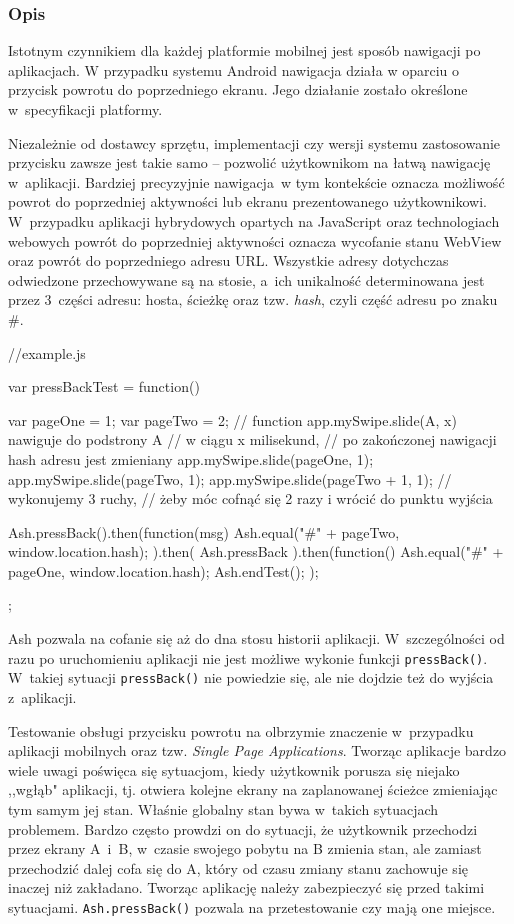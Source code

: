 \documentclass[brudnopis]{xmgr}
\begin{document}
\subsubsection{Opis}

Istotnym czynnikiem dla każdej platformie mobilnej jest sposób nawigacji po aplikacjach.  W przypadku systemu Android nawigacja działa w oparciu o przycisk powrotu do poprzedniego ekranu. Jego działanie zostało określone w~specyfikacji platformy.

Niezależnie od dostawcy sprzętu, implementacji czy wersji systemu zastosowanie przycisku zawsze jest takie samo -- pozwolić użytkownikom na łatwą nawigację w~aplikacji. Bardziej precyzyjnie nawigacja~w tym kontekście  oznacza możliwość powrot do poprzedniej aktywności lub ekranu prezentowanego użytkownikowi. W~przypadku aplikacji hybrydowych opartych na JavaScript oraz technologiach webowych powrót do poprzedniej aktywności oznacza wycofanie stanu WebView oraz powrót do poprzedniego adresu URL. Wszystkie adresy dotychczas odwiedzone przechowywane są na stosie, a~ich unikalność determinowana jest przez 3~części adresu: hosta, ścieżkę oraz tzw. \textit{hash}, czyli część adresu po znaku \#. 

\begin{javascriptcode}
   //example.js

  var pressBackTest = function(){
    var pageOne = 1;
    var pageTwo = 2;
    // function app.mySwipe.slide(A, x) nawiguje do podstrony A 
    // w ciągu x milisekund,
    // po zakończonej nawigacji hash adresu jest zmieniany
    app.mySwipe.slide(pageOne, 1); 
    app.mySwipe.slide(pageTwo, 1); 
    app.mySwipe.slide(pageTwo + 1, 1); //  wykonujemy 3 ruchy, 
       //  żeby móc cofnąć się 2 razy i wrócić do punktu wyjścia 
    
    Ash.pressBack().then(function(msg){
      Ash.equal("#" + pageTwo, window.location.hash);
    }).then(
      Ash.pressBack
    ).then(function(){
      Ash.equal("#" + pageOne, window.location.hash);
      Ash.endTest();
    });
  };
\end{javascriptcode}

Ash pozwala na cofanie się aż do dna stosu historii aplikacji. W~szczególności od razu po uruchomieniu aplikacji nie jest możliwe wykonie funkcji \texttt{pressBack()}. W~takiej sytuacji \texttt{pressBack()} nie powiedzie się, ale nie dojdzie też do wyjścia z~aplikacji.

Testowanie obsługi przycisku powrotu na olbrzymie znaczenie w~przypadku aplikacji mobilnych oraz tzw. \textit{Single Page Applications}. Tworząc aplikacje bardzo wiele uwagi poświęca się sytuacjom, kiedy użytkownik porusza się niejako ,,wgłąb" aplikacji, tj. otwiera kolejne ekrany na zaplanowanej ścieżce zmieniając tym samym jej stan.  Właśnie globalny stan bywa w~takich sytuacjach problemem. Bardzo często prowdzi on do sytuacji, że użytkownik przechodzi przez ekrany A~i~B, w~czasie swojego pobytu na B zmienia stan, ale zamiast przechodzić dalej cofa się do A, który od czasu zmiany stanu zachowuje się inaczej niż zakładano. Tworząc aplikację należy zabezpieczyć się przed takimi sytuacjami. \texttt{Ash.pressBack()} pozwala na przetestowanie czy mają one miejsce. 
\end{document}
